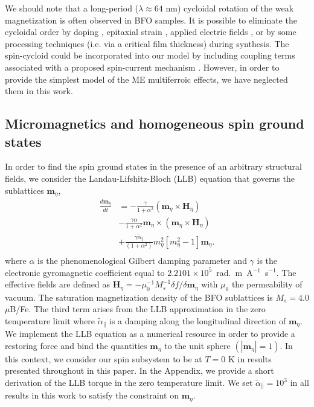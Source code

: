 \documentclass[%
 reprint,
superscriptaddress,
 amsmath,amssymb,
prb,
]{revtex4-1}
\begin{document}
%
We should note that a long-period ($\lambda \approx 64$ nm) cycloidal rotation of the weak magnetization is often observed in BFO samples\cite{Burns2020, Agbelele2017, Xu2021}.
%
It is possible to eliminate the cycloidal order by doping \cite{Sosnowska2002}, epitaxial strain \cite{Bai2005, Sando2013, Burns2020}, applied electric fields \cite{deSousa2013}, or by some processing techniques (i.e. via a critical film thickness) \cite{Burns2020} during synthesis.
%
The spin-cycloid could be incorporated into our model by including coupling terms associated with a proposed spin-current mechanism \cite{Agbelele2017, Popkov2016, Xu2022}. However, in order to provide the simplest model of the ME multiferroic effects, we have neglected them in this work.
%

%
\subsection{Micromagnetics and homogeneous spin ground states}\label{sec:magHo}
%

%
In order to find the spin ground states in the presence of an arbitrary structural fields, we consider the Landau-Lifshitz-Bloch (LLB) equation \cite{Garanin2004} that governs the sublattices $\mathbf{m}_\eta$, %
%
%
\begin{equation}\label{eqn:LLG_LLB}
\begin{aligned}
    \frac{d \mathbf{m}_\eta}{dt}&=-\frac{\gamma}{1+\alpha^2}\left(\mathbf{m}_\eta\times\mathbf{H}_\eta\right) \\
    &-\frac{\gamma\alpha}{1+\alpha^2}\mathbf{m}_\eta\times\left(\mathbf{m}_\eta\times\mathbf{H}_\eta\right) \\
    &+ \frac{\gamma\tilde\alpha_\parallel} {(1+\alpha^2)} m_\eta^2 \left[m_\eta^2 - 1\right]\mathbf{m}_\eta. \\
\end{aligned}
\end{equation}
%
where $\alpha$ is the phenomenological Gilbert damping parameter and $\gamma$ is the electronic gyromagnetic coefficient equal to $2.2101\times10^5$~rad.~m~A${}^{-1}$~s${}^{-1}$. 
%
The effective fields are defined as $\mathbf{H}_\eta = - \mu_0^{-1} M_s^{-1} \delta f / \delta \mathbf{m}_\eta$ with $\mu_0$ the permeability of vacuum. The saturation magnetization density of the BFO sublattices is $M_s = 4.0$ $\mu$B/Fe\cite{Weingart2012,Xu2019,Xu2022}.
%
The third term arises from the LLB approximation in the zero temperature limit where $\tilde\alpha_\parallel$ is a damping along the longitudinal direction of $\mathbf{m}_\eta$.
%
We implement the LLB equation as a numerical resource in order to provide a restoring force and bind the quantities $\mathbf{m}_\eta$ to the unit sphere $(|\mathbf{m}_\eta| = 1)$.
%
In this context, we consider our spin subsystem to be at $T = 0$ K in results presented throughout in this paper.
%
In the Appendix, we provide a short derivation of the LLB torque in the zero temperature limit.
%
We set $\tilde\alpha_\parallel = 10^3$ in all results in this work to satisfy the constraint on $\mathbf{m}_\eta$.
%
\end{document}
